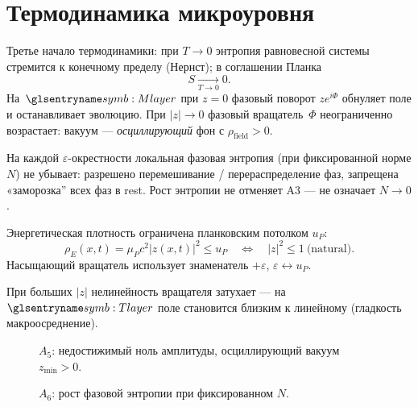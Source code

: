 \section{Термодинамика микроуровня}

\begin{axiom}
\label{ax:A5}
Третье начало термодинамики: при $T\to 0$ энтропия равновесной системы стремится к конечному
пределу (Нернст); в соглашении Планка
\[
  S \xrightarrow[T\to 0]{} 0.
\]
На~$\layerMicro$ при $z=0$ фазовый поворот $z e^{i\Phi}$ обнуляет поле
и останавливает эволюцию.
При $|z|\to 0$ фазовый вращатель~$\Phi$ неограниченно возрастает: вакуум --- \emph{осциллирующий} фон
с $\rho_{\mathrm{field}}>0$.
\end{axiom}

\begin{axiom}
\label{ax:A6}
На каждой $\varepsilon$-окрестности локальная фазовая энтропия (при фиксированной норме $N$)
не убывает: разрешено перемешивание / перераспределение фаз, запрещена «заморозка'' всех фаз в rest.
Рост энтропии не отменяет A3 --- не означает $N\to 0$.
\end{axiom}

\begin{axiom}
\label{ax:A7}
Энергетическая плотность ограничена планковским потолком $u_P$:
\[
  \rho_E(x,t)=\mu_P c^2 |z(x,t)|^2 \le u_P
  \quad\Leftrightarrow\quad
  |z|^2 \le 1 \ \text{(natural)}.
\]
Насыщающий вращатель использует знаменатель $+\varepsilon$, $\varepsilon\leftrightarrow u_P$.
\end{axiom}

\begin{axiom}
\label{ax:A8}
При больших $|z|$ нелинейность вращателя затухает --- на $\Tlayer$ поле становится близким к линейному
(гладкость макроосреднение).
\end{axiom}

\begin{figure}[htbp]
  \centering
  
  \caption{$A_5$: недостижимый ноль амплитуды, осциллирующий вакуум $z_{\min}>0$.}
  \label{fig:axiom-a5-vacuum}
\end{figure}

\begin{figure}[htbp]
  \centering
  
  \caption{$A_6$: рост фазовой энтропии при фиксированном $N$.}
  \label{fig:axiom-a6-entropy}
\end{figure}

